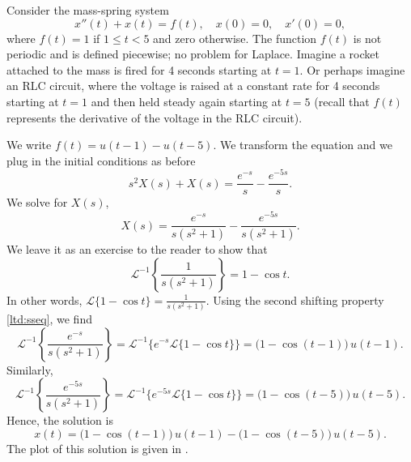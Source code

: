\begin{example} \label{lt:rocketex}
Consider
the mass-spring system
\begin{equation*}
x''(t) + x(t) = f(t) , \quad x(0) = 0, \quad x'(0) = 0,
\end{equation*}
where $f(t) = 1$ if $1 \leq t < 5$ and zero otherwise.
The function $f(t)$ is not periodic and is defined piecewise; no problem for Laplace.
Imagine a
rocket attached to the mass is fired for 4 seconds starting at
$t=1$.  Or perhaps imagine an RLC circuit, where the voltage is raised
at a constant rate for 4 seconds starting at $t=1$ and then held steady 
again
starting at $t=5$ (recall that $f(t)$ represents the derivative of
the voltage in the RLC circuit).

\pagebreak[2]
We write $f(t) = u(t-1) - u(t-5)$.  We transform the equation and we plug in
the initial conditions as before
\begin{equation*}
s^2 X(s) + X(s) = \frac{e^{-s}}{s} - \frac{e^{-5s}}{s} .
\end{equation*}
We solve for $X(s)$,
\begin{equation*}
X(s) = \frac{e^{-s}}{s(s^2+1)} - \frac{e^{-5s}}{s(s^2+1)} .
\end{equation*}
We leave it as an exercise to the reader to show that
\begin{equation*}
{\mathcal{L}}^{-1} \left\{ \frac{1}{s(s^2+1)} \right\}
= 1 - \cos t .
\end{equation*}
In other words,
$\mathcal{L} \{ 1 - \cos t  \} = 
\frac{1}{s(s^2+1)}$.
Using the second shifting property \eqref{ltd:sseq}, we find
\begin{equation*}
{\mathcal{L}}^{-1} \left\{ \frac{e^{-s}}{s(s^2+1)} \right\}
=
{\mathcal{L}}^{-1} \bigl\{
e^{-s}
\mathcal{L} \{ 1 - \cos t \}
\bigr\}
=
\bigl( 1 - \cos (t-1) \bigr) \, u(t-1) .
\end{equation*}
Similarly,
\begin{equation*}
{\mathcal{L}}^{-1} \left\{ \frac{e^{-5s}}{s(s^2+1)} \right\}
=
{\mathcal{L}}^{-1} \bigl\{
e^{-5s}
\mathcal{L} \{ 1 - \cos t \}
\bigr\}
=
\bigl( 1 - \cos (t-5) \bigr) \, u(t-5) .
\end{equation*}
Hence, the solution is
\begin{equation*}
x(t) = 
\bigl( 1 - \cos (t-1) \bigr) \, u(t-1) -
\bigl( 1 - \cos (t-5) \bigr) \, u(t-5) .
\end{equation*}
The plot of this solution is given in .

\begin{myfig}
\capstart
{}
\caption{Plot of $x(t)$.\label{lt:heavisideexfig}}
\end{myfig}
\end{example}

